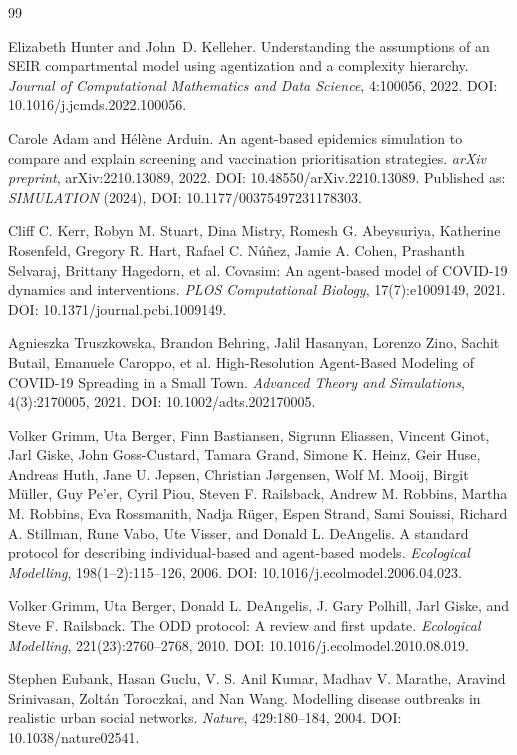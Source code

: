 \documentclass{article}
\begin{document}
\begin{thebibliography}{99}

Elizabeth Hunter and John~D. Kelleher.
\newblock Understanding the assumptions of an SEIR compartmental model using agentization and a complexity hierarchy.
\newblock \emph{Journal of Computational Mathematics and Data Science}, 4:100056, 2022.
\newblock DOI: 10.1016/j.jcmds.2022.100056.

Carole Adam and H{\'e}l{\`e}ne Arduin.
\newblock An agent-based epidemics simulation to compare and explain screening and vaccination prioritisation strategies.
\newblock \emph{arXiv preprint}, arXiv:2210.13089, 2022.
\newblock DOI: 10.48550/arXiv.2210.13089. Published as: \emph{SIMULATION} (2024), DOI: 10.1177/00375497231178303.

Cliff C. Kerr, Robyn M. Stuart, Dina Mistry, Romesh G. Abeysuriya, Katherine Rosenfeld, Gregory R. Hart, Rafael C. N{\'u}{\~n}ez, Jamie A. Cohen, Prashanth Selvaraj, Brittany Hagedorn, et al.
\newblock Covasim: An agent-based model of COVID-19 dynamics and interventions.
\newblock \emph{PLOS Computational Biology}, 17(7):e1009149, 2021.
\newblock DOI: 10.1371/journal.pcbi.1009149.

Agnieszka Truszkowska, Brandon Behring, Jalil Hasanyan, Lorenzo Zino, Sachit Butail, Emanuele Caroppo, et al.
\newblock High-Resolution Agent-Based Modeling of COVID-19 Spreading in a Small Town.
\newblock \emph{Advanced Theory and Simulations}, 4(3):2170005, 2021.
\newblock DOI: 10.1002/adts.202170005.

Volker Grimm, Uta Berger, Finn Bastiansen, Sigrunn Eliassen, Vincent Ginot, Jarl Giske, John Goss-Custard, Tamara Grand, Simone K. Heinz, Geir Huse, Andreas Huth, Jane U. Jepsen, Christian J{\o}rgensen, Wolf M. Mooij, Birgit M{\"u}ller, Guy Pe'er, Cyril Piou, Steven F. Railsback, Andrew M. Robbins, Martha M. Robbins, Eva Rossmanith, Nadja R{\"u}ger, Espen Strand, Sami Souissi, Richard A. Stillman, Rune Vabo, Ute Visser, and Donald L. DeAngelis.
\newblock A standard protocol for describing individual-based and agent-based models.
\newblock \emph{Ecological Modelling}, 198(1--2):115--126, 2006.
\newblock DOI: 10.1016/j.ecolmodel.2006.04.023.

Volker Grimm, Uta Berger, Donald L. DeAngelis, J. Gary Polhill, Jarl Giske, and Steve F. Railsback.
\newblock The ODD protocol: A review and first update.
\newblock \emph{Ecological Modelling}, 221(23):2760--2768, 2010.
\newblock DOI: 10.1016/j.ecolmodel.2010.08.019.

Stephen Eubank, Hasan Guclu, V. S. Anil Kumar, Madhav V. Marathe, Aravind Srinivasan, Zolt{\'a}n Toroczkai, and Nan Wang.
\newblock Modelling disease outbreaks in realistic urban social networks.
\newblock \emph{Nature}, 429:180--184, 2004.
\newblock DOI: 10.1038/nature02541.

\end{thebibliography}
\end{document}
